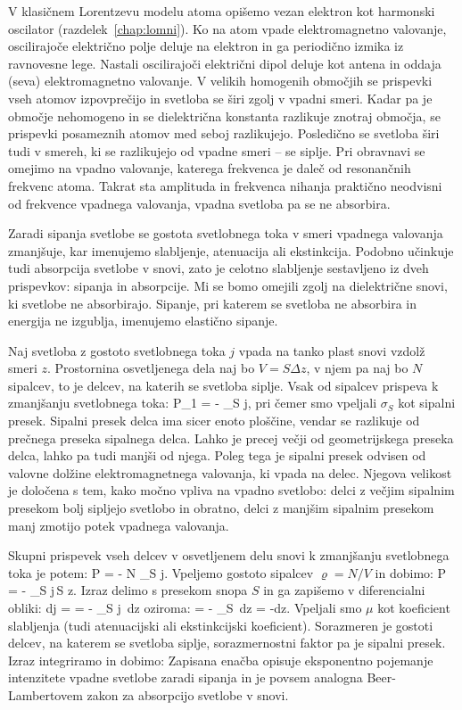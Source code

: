 V klasičnem Lorentzevu modelu atoma opišemo vezan elektron kot harmonski 
oscilator (razdelek~\ref{chap:lomni}). Ko na atom vpade
elektromagnetno valovanje, oscilirajoče električno polje deluje na elektron in 
ga periodično izmika iz ravnovesne lege. Nastali oscilirajoči električni dipol 
deluje kot antena in oddaja (seva) elektromagnetno valovanje. V velikih 
homogenih območjih se prispevki vseh atomov izpovprečijo in svetloba
se širi zgolj v vpadni smeri. Kadar pa je območje nehomogeno in se dielektrična
konstanta razlikuje znotraj območja, se prispevki posameznih atomov med seboj
razlikujejo. Posledično se svetloba širi tudi v smereh, ki 
se razlikujejo od vpadne smeri -- se siplje. Pri obravnavi se omejimo na 
vpadno valovanje, katerega frekvenca je daleč od resonančnih frekvenc atoma.
Takrat sta amplituda in frekvenca nihanja praktično neodvisni od frekvence 
vpadnega valovanja, vpadna svetloba pa se ne absorbira. 

Zaradi sipanja svetlobe se gostota svetlobnega toka v smeri vpadnega valovanja
zmanjšuje, kar imenujemo slabljenje, atenuacija ali ekstinkcija. Podobno učinkuje tudi 
absorpcija svetlobe v snovi, zato je celotno slabljenje sestavljeno iz dveh 
prispevkov: sipanja in absorpcije. Mi se bomo omejili zgolj na dielektrične 
snovi, ki svetlobe ne absorbirajo. Sipanje, pri katerem se svetloba ne absorbira
in energija ne izgublja, imenujemo elastično sipanje.

Naj svetloba z gostoto svetlobnega toka $j$ vpada na tanko plast snovi 
vzdolž smeri $z$. Prostornina osvetljenega dela naj bo $V = S \Delta z$,
v njem pa naj bo $N$ sipalcev, to je delcev, na katerih se svetloba siplje. 
Vsak od sipalcev prispeva k zmanjšanju svetlobnega toka:
\beq
\Delta P_1 = - \sigma_S j,
\label{eq:07_01}
\eeq
pri čemer smo vpeljali $\sigma_S$ kot sipalni presek. Sipalni presek delca ima sicer
enoto ploščine, vendar se razlikuje od prečnega preseka sipalnega delca. Lahko je 
precej večji od geometrijskega preseka delca, lahko pa tudi manjši od njega. Poleg
tega je sipalni presek odvisen od valovne dolžine elektromagnetnega valovanja, 
ki vpada na delec. Njegova velikost je določena s tem, kako močno vpliva na vpadno 
svetlobo: delci z večjim sipalnim presekom bolj sipljejo svetlobo in obratno, 
delci z manjšim sipalnim presekom manj zmotijo potek vpadnega valovanja.

Skupni prispevek vseh delcev v osvetljenem delu snovi k zmanjšanju svetlobnega toka
je potem:
\beq
\Delta P = - N \sigma_S j.
\label{eq:07_02}
\eeq
Vpeljemo gostoto sipalcev $\varrho = N/V$ in dobimo:
\beq
\Delta P = - \sigma_S j\,\varrho S \Delta z.
\label{eq:07_03}
\eeq
Izraz delimo s presekom snopa $S$ in ga zapišemo v diferencialni obliki:
\beq
dj =  = - \sigma_S j\, \varrho dz
\label{eq:07_04}
\eeq
oziroma:
\beq
{} = - \sigma_S\, \varrho dz = -\mu dz.
\label{eq:07_05}
\eeq
Vpeljali smo $\mu$ kot koeficient slabljenja (tudi atenuacijski ali ekstinkcijski 
koeficient). Sorazmeren je gostoti delcev, na katerem se svetloba siplje, sorazmernostni
faktor pa je sipalni presek. Izraz integriramo in dobimo:
Zapisana enačba opisuje eksponentno pojemanje intenzitete vpadne svetlobe zaradi 
sipanja in je povsem analogna Beer-Lambertovem zakon za absorpcijo svetlobe v snovi. 

